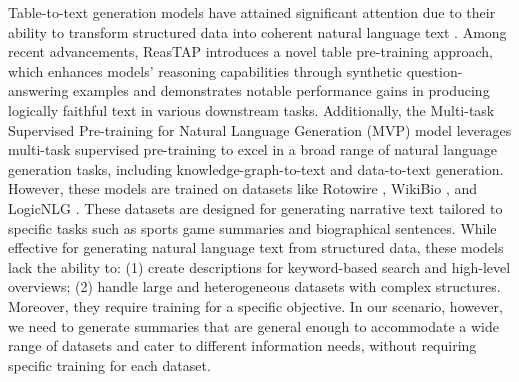 Table-to-text generation models have attained significant attention due to their ability to transform structured data into coherent natural language text \cite{chen2019d2t_lm_switch, puduppully2019d2t_ncp, gong2020tablegpt, chen2020kgpt, liu2021d2t_augplan, su2021d2t_p2g, wang2021d2t_sketch, puduppully2021d2t_macro, zhao2022reastap, tang2023mvp, seo2024unveiling}. 
% 
Among recent advancements, ReasTAP \cite{zhao2022reastap} introduces a novel table pre-training approach, which enhances models' reasoning capabilities through synthetic question-answering examples and demonstrates notable performance gains in producing logically faithful text in various downstream tasks. Additionally, the Multi-task Supervised Pre-training for Natural Language Generation (MVP) model \cite{tang2023mvp} leverages multi-task supervised pre-training to excel in a broad range of natural language generation tasks, including knowledge-graph-to-text and data-to-text generation. 
% 
However, these models are trained on datasets like Rotowire \cite{wiseman2017rotowire}, WikiBio \cite{lebret2016wikibio}, and LogicNLG \cite{chen2020logicNLG}. These datasets are designed for generating narrative text tailored to specific tasks such as sports game summaries and biographical sentences.
% 
While effective for generating natural language text from structured data, these models lack the ability to: (1) create descriptions for keyword-based search and high-level overviews; (2) handle large and heterogeneous datasets with complex structures.
% 
Moreover, they require training for a specific objective. In our scenario, however, we need to generate summaries that are general enough to accommodate a wide range of datasets and cater to different information needs, without requiring specific training for each dataset.

